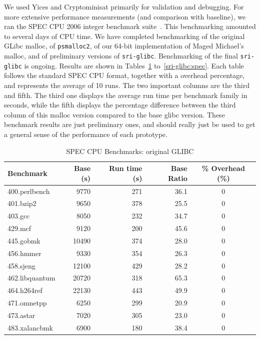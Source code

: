 \documentclass[twoside,12pt]{cslreport}
\begin{document}
We used Yices and Cryptominisat primarily for validation and
debugging. For more extensive performance measurements (and comparison
with baseline), we ran the SPEC CPU 2006 integer benchmark
suite~\cite{spec2006}. This benchmarking amounted to several days of
CPU time. We have completed benchmarking of the original GLibc malloc,
of \texttt{psmalloc2}, of our 64-bit implementation of Maged Michael's
malloc, and of preliminary versions of
\texttt{sri-glibc}. Benchmarking of the final \texttt{sri-glibc} is
ongoing.  Results are shown in Tables~\ref{glibc:spec}
to~\ref{sri-glibc:spec}.  Each table follows the standard SPEC CPU format,
together with a overhead percentage,
and represents the average of 10 runs. The two important columns are
the third and fifth. The third one displays the average run time per benchmark
family in seconds, while the fifth displays the percentage difference between
the third column of this malloc version compared to the base glibc version.
These benchmark results are just preliminary ones, and should really just be used to get
a general sense of the performance of each prototype.


\begin{table}
\begin{center}
\begin{tabular}{|l|r|r|r|c|}
\hline
Benchmark  & Base  (s)  & Run time (s) &  Base Ratio & \% Overhead (\%)\\
\hline
400.perlbench    & 9770        & 271       & 36.1 & 0 \\
401.bzip2        & 9650        & 378       & 25.5 & 0 \\
403.gcc          & 8050        & 232       & 34.7 & 0 \\
429.mcf          & 9120        & 200       & 45.6 & 0 \\
445.gobmk       & 10490        & 374       & 28.0 & 0 \\
456.hmmer        & 9330        & 354       & 26.3 & 0 \\
458.sjeng       & 12100        & 429       & 28.2 & 0 \\
462.libquantum  & 20720        & 318       & 65.3 & 0 \\
464.h264ref     & 22130        & 443       & 49.9 & 0 \\
471.omnetpp      & 6250        & 299       & 20.9 & 0 \\
473.astar        & 7020        & 305       & 23.0 & 0 \\
483.xalancbmk    & 6900        & 180       & 38.4 & 0 \\
\hline
\end{tabular}
\end{center}
\caption{SPEC CPU Benchmarks: original GLIBC}
\label{glibc:spec}
\end{table}
\end{document}
